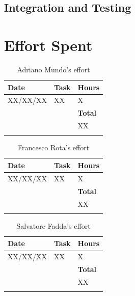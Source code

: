 \documentclass{article}
\begin{document}
	\subsection{Integration and Testing}
	\pagebreak
		
\section{Effort Spent}
\begin{longtable}{| p{2 cm} | p{6 cm} | p{1 cm} |} 
			\hline
			{\bf Date} & {\bf Task} & {\bf Hours}\\
			\hline
			XX/XX/XX & XX & X \\
			\hline
			& & {\bf Total} \\
			\hline
			& & XX \\
			\hline
			\caption{Adriano Mundo's effort} 
\end{longtable}

\begin{longtable}{| p{2 cm} | p{6 cm} | p{1 cm} |} 
			\hline
			{\bf Date} & {\bf Task} & {\bf Hours}\\
			\hline
			XX/XX/XX & XX & X \\
			\hline
			& & {\bf Total} \\
			\hline
			& & XX \\
			\hline
			\caption{Francesco Rota's effort} 
\end{longtable}

\begin{longtable}{| p{2 cm} | p{6 cm} | p{1 cm} |} 
			\hline
			{\bf Date} & {\bf Task} & {\bf Hours}\\
			\hline
			XX/XX/XX & XX & X \\
			\hline
			& & {\bf Total} \\
			\hline
			& & XX \\
			\hline
			\caption{Salvatore Fadda's effort} 
\end{longtable}
	
	
\end{document}
